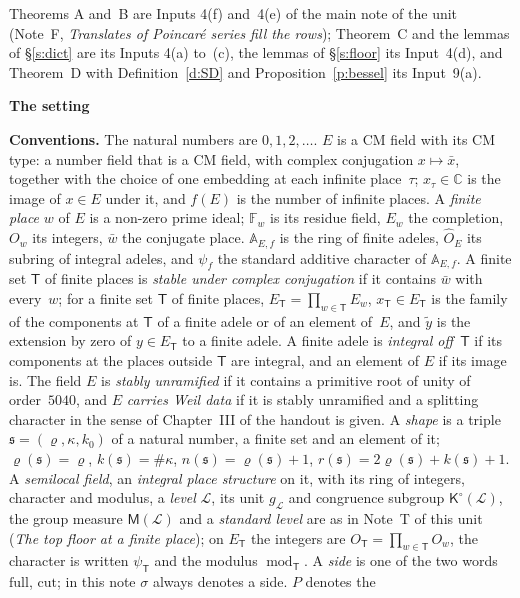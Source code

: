 \documentclass[11pt,a4paper]{article}
\newcommand{\F}{\mathbb{F}}
\newcommand{\m}[1]{\mbox{$#1$}}        %
\newcommand{\sect}[2]{\refstepcounter{section}\label{#2}\par\addvspace{19pt plus 4pt minus 2pt}\Needspace{7\baselineskip}%
  \noindent\llap{{\fontsize{13.2}{16}\selectfont\bfseries\color{inkfaint}\thesection}\hspace{9pt}}%
  {\fontsize{13.2}{16}\selectfont\bfseries\color{ink}#1}\par\nopagebreak\vspace{-1pt}}
\theoremstyle{plainx}
\theoremstyle{uprightx}
\newenvironment{conventions}{\par\addvspace{5pt}\noindent\textbf{Conventions.}\enspace\ignorespaces}{\par\addvspace{3pt}}
\newcommand{\fs}{\mathfrak{s}}                      %
\newcommand{\sT}{\mathsf{T}}                        %
\newcommand{\cL}{\mathcal{L}}                       %
\newcommand{\AEf}{\mathbb{A}_{E,f}}
\newcommand{\hO}{\hat{O}_E}
\newcommand{\full}{\mathrm{full}}
\newcommand{\cut}{\mathrm{cut}}
\newcommand{\rh}[1]{\varrho(#1)}                    %
\newcommand{\kk}[1]{k(#1)}                          %
\newcommand{\nn}[1]{n(#1)}                          %
\newcommand{\rr}[1]{r(#1)}                          %
\newcommand{\ninf}[1]{f(#1)}                        %
\newcommand{\ET}[1]{E_{#1}}                         %
\newcommand{\modT}[1]{\operatorname{mod}_{#1}}      %
\newcommand{\psiT}[1]{\psi_{#1}}                    %
\newcommand{\cgp}[1]{\mathsf{K}^{\circ}(#1)}        %
\newcommand{\gL}[1]{g_{#1}}                         %
\newcommand{\gM}[1]{\mathsf{M}(#1)}                 %
\newcommand{\CC}{\mathbb{C}}
\begin{document}
Theorems A and~B are Inputs 4(f) and~4(e) of the main note of the unit (Note~F, \emph{Translates of Poincaré
series fill the rows}); Theorem~C and the lemmas of §\ref{s:dict} are its Inputs 4(a) to~(c), the lemmas of
§\ref{s:floor} its Input~4(d), and Theorem~D with Definition~\ref{d:SD} and Proposition~\ref{p:bessel} its
Input~9(a).

\sect{The setting}{s:setting}
\begin{conventions}\label{c:conventions}
The natural numbers are \m{0,1,2,\dots}. $E$ is a CM field with its CM type: a number field that is a CM field,
with complex conjugation \m{x\mapsto\bar x}, together with the choice of one embedding at each infinite
place~$\tau$; \m{x_\tau\in\CC} is the image of \m{x\in E} under it, and \m{\ninf{E}} is the number of infinite
places. A \emph{finite place} $w$ of $E$ is a non-zero prime ideal; \m{\F_w} is its residue field, $E_w$ the
completion, $O_w$ its integers, $\bar w$ the conjugate place. \m{\AEf} is the ring of finite adeles, \m{\hO} its
subring of integral adeles, and $\psi_f$ the standard additive character of \m{\AEf}. A finite set $\sT$ of
finite places is \emph{stable under complex conjugation} if it contains $\bar w$ with every~$w$; for a finite
set $\sT$ of finite places, \m{\ET{\sT}=\prod_{w\in\sT}E_w}, \m{x_{\sT}\in\ET{\sT}} is the family of the components
at $\sT$ of a finite adele or of an element of~$E$, and $\tilde y$ is the extension by zero of
\m{y\in\ET{\sT}} to a finite adele. A finite adele is \emph{integral off~$\sT$} if its components at the places
outside $\sT$ are integral, and an element of $E$ if its image is. The field $E$ is \emph{stably unramified} if
it contains a primitive root of unity of order~$5040$, and $E$ \emph{carries Weil data} if it is stably
unramified and a splitting character in the sense of Chapter~III of the handout is given. A \emph{shape} is a
triple \m{\fs=(\varrho,\kappa,k_0)} of a natural number, a finite set and an element of it; \m{\rh{\fs}=\varrho},
\m{\kk{\fs}=\#\kappa}, \m{\nn{\fs}=\rh{\fs}+1}, \m{\rr{\fs}=2\rh{\fs}+\kk{\fs}+1}. A \emph{semilocal field}, an
\emph{integral place structure} on it, with its ring of integers, character and modulus, a \emph{level} $\cL$,
its unit \m{\gL{\cL}} and congruence subgroup \m{\cgp{\cL}}, the group measure \m{\gM{\cL}} and a \emph{standard
level} are as in Note~T of this unit (\emph{The top floor at a finite place}); on \m{\ET{\sT}} the integers are
\m{O_{\sT}=\prod_{w\in\sT}O_w}, the character is written \m{\psiT{\sT}} and the modulus \m{\modT{\sT}}. A \emph{side}
is one of the two words \m{\full}, \m{\cut}; in this note $\sigma$ always denotes a side. $P$ denotes the

\end{conventions}
\end{document}
